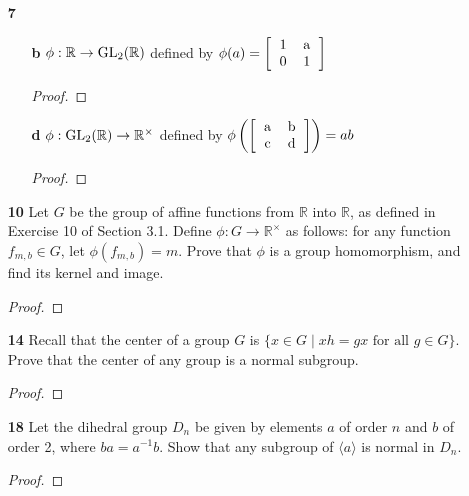 \documentclass[paper=usletter, fontsize=12pt]{article}
\begin{document}
\begin{itemize}
\begin{enumerate}
            \item[\textbf{7}]
            \begin{enumerate}

                \item[\textbf{b}] $\phi: \mathbb{R} \rightarrow \text{GL}_2(\mathbb{R})$ defined by $\phi(a)=\left[\begin{tabular}{cc}
                            1 & a \\
                            0 & 1
                \end{tabular}\right]$
                \begin{proof}
                \end{proof}

                \item[\textbf{d}] $\phi: \text{GL}_2(\mathbb{R}) \rightarrow \mathbb{R}^{\times}$ defined by $\phi\left(\left[\begin{tabular}{cc}
                            a & b \\
                            c & d
                \end{tabular}\right]\right)=ab$
                \begin{proof}
                \end{proof}

            \end{enumerate}

            \item[\textbf{10}] Let $G$ be the group of affine functions from
            $\mathbb{R}$ into $\mathbb{R}$, as defined in Exercise 10 of
            Section 3.1. Define $\phi:G \rightarrow \mathbb{R}^{\times}$ as
            follows: for any function $f_{m,b} \in G$, let $\phi(f_{m,b})=m$.
            Prove that $\phi$ is a group homomorphism, and find its kernel and
            image.
            \begin{proof}
            \end{proof}

            \item[\textbf{14}] Recall that the center of a group $G$ is $\{x
            \in G \mid xh=gx \text{ for all } g \in G\}$. Prove that the center
            of any group is a normal subgroup.
            \begin{proof}
            \end{proof}

            \item[\textbf{18}] Let the dihedral group $D_n$ be given by
            elements $a$ of order $n$ and $b$ of order 2, where $ba=a^{-1}b$.
            Show that any subgroup of $\langle a\rangle$ is normal in $D_n$.
            \begin{proof}
            \end{proof}


\end{enumerate}
\end{itemize}
\end{document}
